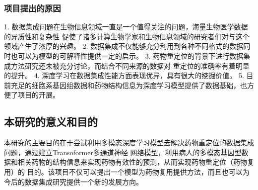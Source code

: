 \subsubsection{项目提出的原因}
1. 数据集成问题在生物信息领域一直是一个值得关注的问题，海量生物医学数据的异质性和复杂性
促使了诸多计算生物学家和生物信息领域的研究者们对与这个领域产生了浓厚的兴趣。
2. 数据集成不仅能够充分利用到各种不同格式的数据同时也可以为模型的可解释性提供一定的启示。
3. 药物重定位的背景下进行数据集成方法研究还未被充分讨论，而结合不同来源的数据对
重定位的准确率有着明显的提升。
4. 深度学习在数据集成性能方面表现优异，具有很大的挖掘价值。
5. 目前充足的细胞系基因组数据和药物结构信息为深度学习模型提供了数据基础，也方便了项目的开展。


\subsection{本研究的意义和目的}
本研究的主要目的在于尝试利用多模态深度学习模型去解决药物重定位的数据集成问题，通过建立Transoformer多通道神经
网络模型，利用病人的多模态基因型数据和相关药物的结构信息来实现药物有效性的预测，从而实现药物重定位（药物复用）的
目的。该项目不仅可以提出一个模型为药物复用提供方法，而且也可以为今后的数据集成研究提供一个新的发展方向。
